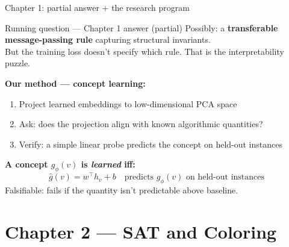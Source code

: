 \documentclass[aspectratio=169,10pt,dvipsnames]{beamer}
\begin{document}
\begin{frame}{Chapter 1: partial answer + the research program}

\begin{block}{Running question — Chapter 1 answer (partial)}
\small
Possibly: a \textbf{transferable message-passing rule} capturing structural invariants.\\
But the training loss doesn't specify which rule. That is the interpretability puzzle.
\end{block}

\medskip
\textbf{Our method — concept learning:}
\begin{enumerate}\small
  \item Project learned embeddings to low-dimensional PCA space
  \item Ask: does the projection align with known algorithmic quantities?
  \item Verify: a simple linear probe predicts the concept on held-out instances
\end{enumerate}

\medskip
\textbf{A concept $g_\phi(v)$ is \textit{learned} iff:}
\[
  \hat{g}(v) = w^\top h_v + b \quad\text{predicts } g_\phi(v) \text{ on held-out instances}
\]
\small Falsifiable: fails if the quantity isn't predictable above baseline.

\end{frame}


\section{Chapter 2 — SAT and Coloring}
\end{document}
